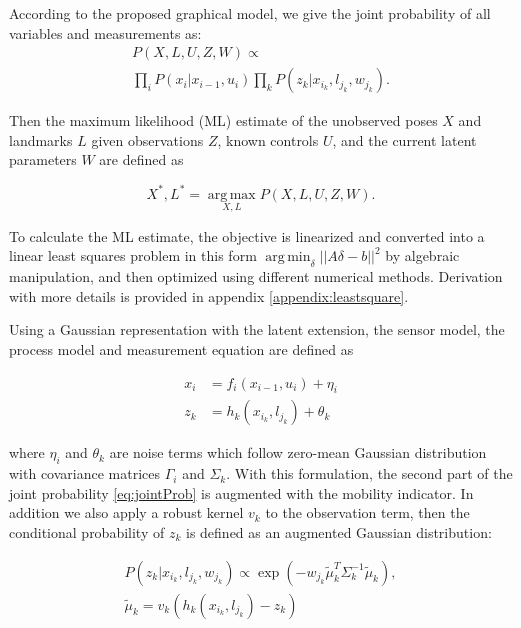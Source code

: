 According to the proposed graphical model, we give the joint probability of all variables and measurements as:
\begin{multline}
P(X, L, U, Z, W) \propto  \\
\prod\limits_{i}P(x_i|x_{i-1}, u_i)\prod\limits_{k}P(z_k|x_{i_k}, l_{j_k}, w_{j_k}).
\label{eq:jointProb}
\end{multline}

Then the maximum likelihood (ML) estimate of the unobserved poses $X$ and landmarks $L$ given observations $Z$, known controls $U$, and the current latent parameters $W$ are defined as

\begin{equation}
X^*, L^* = \operatorname*{arg\,max}_{X,L} P(X,L,U,Z,W).
\end{equation}

To calculate the ML estimate, the objective is linearized and converted into a linear least
squares problem in this form $\operatorname*{arg\,min}_{\delta} || A
\delta  - b ||^2$ by algebraic manipulation, and then optimized using
different numerical methods. Derivation with more details is provided in appendix \ref{appendix:leastsquare}.

Using a Gaussian representation with the latent extension, the sensor
model, the process model and measurement equation are defined as

\begin{equation}
\begin{aligned}
x_i &= f_i(x_{i-1}, u_i) + \eta_i \\
z_k &= h_k(x_{i_k}, l_{j_k}) + \theta_k
\end{aligned}
\label{eq:gaussRepresentation}
\end{equation}

where $\eta_i$ and $\theta_k$ are noise terms which follow zero-mean Gaussian distribution with covariance matrices $\Gamma_i$ and $\Sigma_k$. With this formulation, the second part of the joint probability \ref{eq:jointProb} is augmented with the mobility indicator. In addition we also apply a robust kernel $v_k$ to the observation term, then the conditional probability of $z_k$ is defined as an augmented Gaussian distribution:

\begin{equation}
\begin{aligned}
P(z_k|x_{i_k}, l_{j_k}, w_{j_k})\propto \exp(-w_{j_k} \tilde{\mu}_k^T \Sigma_k^{-1} \tilde{\mu}_k),\\
 \tilde{\mu}_k = v_k(h_k(x_{i_k}, l_{j_k}) - z_k)
\label{eq:sensor}
\end{aligned}
\end{equation}

